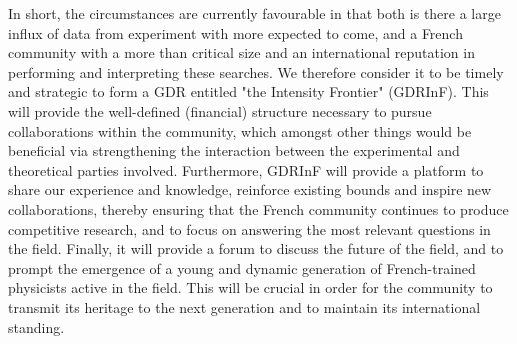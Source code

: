 In short, the circumstances are currently favourable in that both is there a large influx of data from experiment with more expected to come, and a French community with a more than critical size and an international reputation in performing and interpreting these searches. We therefore consider it to be timely and strategic to form a GDR entitled "the Intensity Frontier" (GDRInF). This  will provide the well-defined (financial) structure necessary to pursue collaborations within the community, which amongst other things would be beneficial via strengthening the interaction between the experimental and theoretical parties involved. Furthermore, GDRInF will provide a platform to share our experience and knowledge, reinforce existing bounds and inspire new collaborations, thereby ensuring that the French community continues to produce competitive research, and to focus on answering the most relevant questions in the field. Finally, it will provide a forum to discuss the future of the field, and to prompt the emergence of a young and dynamic generation of French-trained physicists active in the field. This will be crucial in order for the community to transmit its heritage to the next generation and to maintain its international standing.
